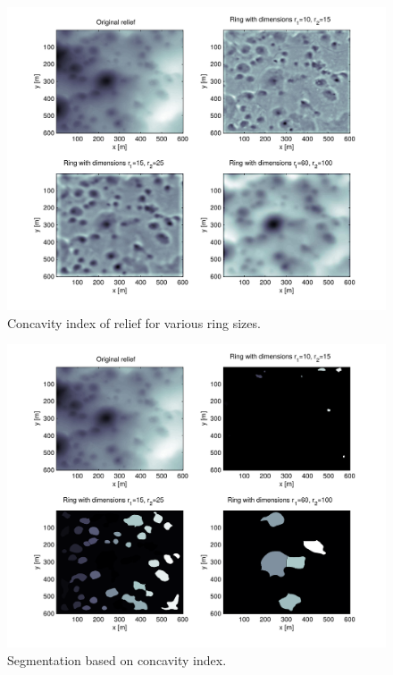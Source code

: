 \documentclass[a0,portrait]{a0poster}
\begin{document}
\begin{multicols}{2}
  \begin{minipage}[b]{0.5\textwidth}
      \begin{minipage}{0.45\linewidth}
          \begin{figure}[H]
              \includegraphics[width=\textwidth]{concavity-samples.pdf}
              \caption{Concavity index of relief for various ring sizes.}
              \label{fig:concavity-samples}
          \end{figure}
      \end{minipage}
      \begin{minipage}{0.45\linewidth}
          \begin{figure}[H]
              \includegraphics[width=\textwidth]{concavity-segmentation-samples.pdf}
              \caption{Segmentation based on concavity index.}
              \label{fig:concavity-segmentation}
          \end{figure}
      \end{minipage}
  \end{minipage}


\end{multicols}
\end{document}
